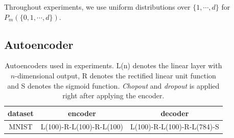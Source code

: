 \documentclass{article}
\begin{document}
    Throughout experiments, we use uniform distributions over $\{1, \cdots, d\}$ for $P_m(\{0, 1, \cdots, d\})$.

    \subsection{Autoencoder}

    \begin{table}
        \caption{Autoencoders used in experiments. L(n) denotes the linear layer with $n$-dimensional output, R denotes the rectified linear unit function and S denotes the sigmoid function. \textit{Chopout} and \textit{dropout} is applied right after applying the encoder.}    
        \centering
        \begin{tabular}{c|c|c}
            dataset & encoder & decoder \\ \hline \hline
            MNIST & L(100)-R-L(100)-R-L(100) & L(100)-R-L(100)-R-L(784)-S
        \end{tabular}
        \label{tab:mnist_ae}
    \end{table}
    
\end{document}
